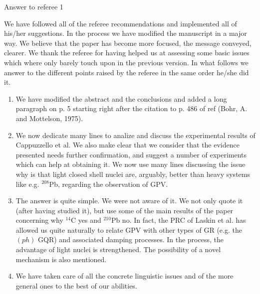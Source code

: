 \documentclass[a4paper,12pt]{book}
\begin{document}
\begin{flushleft}
Answer to referee 1
\end{flushleft}
We have followed all of the referee recommendations and implemented all of his/her suggestions. In the process we have modified the manuscript in a major way. We believe that  the paper has become more focused, the message conveyed, clearer. We thank the referee for having helped us at assessing some basic issues which where only barely touch upon in the previous version. In what follows we answer to the different points raised by the referee in the same order he/she did it. 
\begin{enumerate}
\item We have modified the abstract and the conclusions and added a long paragraph on p. 5 starting right after the citation to p. 486 of ref (Bohr, A. and Mottelson, 1975).
\item We now dedicate many lines to analize and discuss the experimental results of Cappuzzello et al. We also make clear that we consider that the evidence presented needs further confirmation, and suggest a number of experiments which can help at obtaining it. We now use many lines discussing the issue why is that light closed shell nuclei are, arguably, better than heavy systems like e.g. $^{208}$Pb, regarding the observation of GPV.
\item The answer is quite simple. We were not aware of it. We not only quote it (after having studied it), but use some of the main results of the paper concerning why $^{14}$C yes and $^{210}$Pb no. In fact, the PRC of Laskin et al. has allowed us quite naturally to relate GPV with other types of GR (e.g. the $(ph)$ GQR) and associated damping processes. In the process, the advantage of light nuclei is strengthened. The possibility of a novel mechanism is also mentioned.
\item We have taken care of all the concrete linguistic issues and of the more general ones to the best of our abilities.
\end{enumerate}
\end{document}
